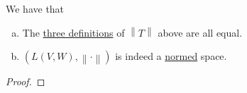 \begin{lemma}
	We have that
	\begin{enumerate}[(a)]
		\item The \hyperref[def:operator-norm]{three definitions} of \(\left\lVert T\right\rVert\) above are all equal.
		\item \((L(V,W), \left\lVert \cdot\right\rVert )\) is indeed a \hyperref[def:norm]{normed} space.
	\end{enumerate}
\end{lemma}
\begin{proof}
\end{proof}